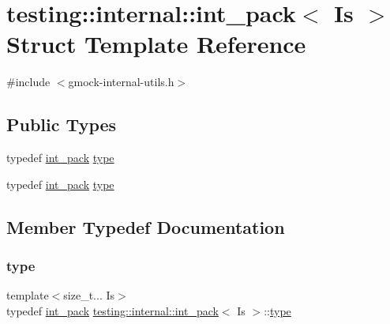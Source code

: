 \hypertarget{structtesting_1_1internal_1_1int__pack}{}\section{testing\+::internal\+::int\+\_\+pack$<$ Is $>$ Struct Template Reference}
\label{structtesting_1_1internal_1_1int__pack}


{\ttfamily \#include $<$gmock-\/internal-\/utils.\+h$>$}

\subsection*{Public Types}
\begin{DoxyCompactItemize}
\item 
typedef \mbox{\hyperlink{structtesting_1_1internal_1_1int__pack}{int\+\_\+pack}} \mbox{\hyperlink{structtesting_1_1internal_1_1int__pack_af7784346f052decccd650110f88694a4}{type}}
\item 
typedef \mbox{\hyperlink{structtesting_1_1internal_1_1int__pack}{int\+\_\+pack}} \mbox{\hyperlink{structtesting_1_1internal_1_1int__pack_af7784346f052decccd650110f88694a4}{type}}
\end{DoxyCompactItemize}


\subsection{Member Typedef Documentation}
\mbox{\label{structtesting_1_1internal_1_1int__pack_af7784346f052decccd650110f88694a4}} 
\subsubsection{\texorpdfstring{type}{type}\hspace{0.1cm}{\footnotesize\ttfamily [1/2]}}
{\footnotesize\ttfamily template$<$size\+\_\+t... Is$>$ \\
typedef \mbox{\hyperlink{structtesting_1_1internal_1_1int__pack}{int\+\_\+pack}} \mbox{\hyperlink{structtesting_1_1internal_1_1int__pack}{testing\+::internal\+::int\+\_\+pack}}$<$ Is $>$\+::\mbox{\hyperlink{structtesting_1_1internal_1_1int__pack_af7784346f052decccd650110f88694a4}{type}}}

